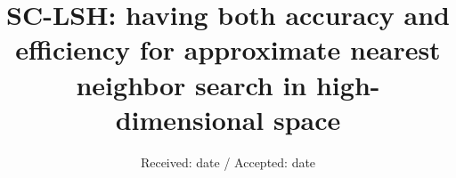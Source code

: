 \documentclass[twocolumn]{svjour3}          %
\begin{document}
\title{SC-LSH: having both accuracy and efficiency for approximate nearest neighbor search in high-dimensional space}

\subtitle{}

\titlerunning{}        %

%



\date{Received: date / Accepted: date}


\maketitle
\end{document}

